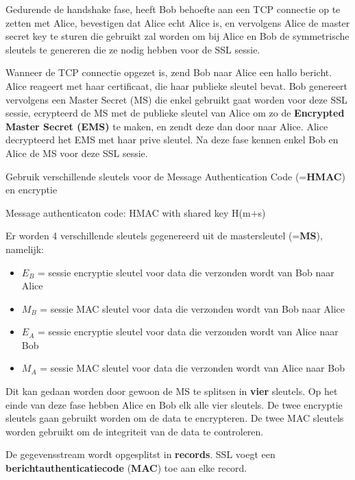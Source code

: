 \noindent Gedurende de handshake fase, heeft Bob behoefte aan een TCP connectie op te zetten met Alice, bevestigen dat Alice echt Alice is, en vervolgens Alice de master secret key te sturen die gebruikt zal worden om bij Alice en Bob de symmetrische sleutels te genereren die ze nodig hebben voor de SSL sessie.

\noindent Wanneer de TCP connectie opgezet is, zend Bob naar Alice een hallo bericht. Alice reageert met haar certificaat, die haar publieke sleutel bevat. Bob genereert vervolgens een Master Secret (MS) die enkel gebruikt gaat worden voor deze SSL sessie, ecrypteerd de MS met de publieke sleutel van Alice om zo de \textbf{Encrypted Master Secret (EMS)} te maken, en zendt deze dan door naar Alice. Alice decrypteerd het EMS met haar prive sleutel. Na deze fase kennen enkel Bob en Alice de MS voor deze SSL sessie.

\clearpage


\noindent Gebruik verschillende sleutels voor de Message Authentication Code (=\textbf{HMAC}) en encryptie

\noindent Message authenticaton code: HMAC with shared key H(m+s)

\noindent Er worden 4 verschillende sleutels gegenereerd uit de mastersleutel (=\textbf{MS}), namelijk:
\begin{itemize}
\item $E_B$ = sessie encryptie sleutel voor data die verzonden wordt van Bob naar Alice
\item $M_B$ = sessie MAC sleutel voor data die verzonden wordt van Bob naar Alice
\item $E_A$ = sessie encryptie sleutel voor data die verzonden wordt van Alice naar Bob
\item $M_A$ = sessie MAC sleutel voor data die verzonden wordt van Alice naar Bob
\end{itemize}

\noindent Dit kan gedaan worden door gewoon de MS te splitsen in \textbf{vier} sleutels. Op het einde van deze fase hebben Alice en Bob elk alle vier sleutels. De twee encryptie sleutels gaan gebruikt worden om de data te encrypteren. De twee MAC sleutels worden gebruikt om de integriteit van de data te controleren.



De gegevensstream wordt opgesplitst in \textbf{records}. SSL voegt een \textbf{berichtauthenticatiecode} (\textbf{MAC}) toe aan elke record.

